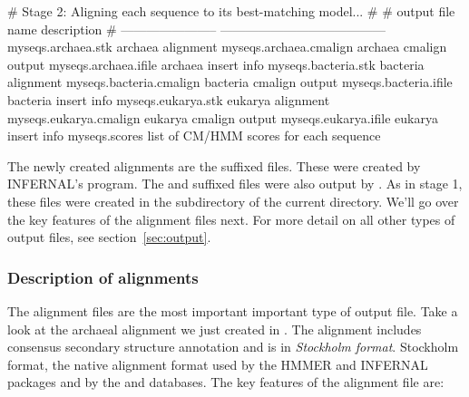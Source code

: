 \begin{sreoutput}
# Stage 2: Aligning each sequence to its best-matching model...
#
# output file name         description
# -----------------------  ---------------------------------------
  myseqs.archaea.stk       archaea alignment
  myseqs.archaea.cmalign   archaea cmalign output
  myseqs.archaea.ifile     archaea insert info
  myseqs.bacteria.stk      bacteria alignment
  myseqs.bacteria.cmalign  bacteria cmalign output
  myseqs.bacteria.ifile    bacteria insert info
  myseqs.eukarya.stk       eukarya alignment
  myseqs.eukarya.cmalign   eukarya cmalign output
  myseqs.eukarya.ifile     eukarya insert info
  myseqs.scores            list of CM/HMM scores for each sequence
\end{sreoutput}

The newly created alignments are the  suffixed files. These
were created by INFERNAL's  program. The
 and  suffixed files were also output by
. As in stage 1, these files were created in the
 subdirectory of the current directory. We'll go over
the key features of the alignment files next. For more detail on all
other types of output files, see section~\ref{sec:output}.

\subsubsection{Description of alignments}
\label{sec:tutorial-stk}

The alignment files are the most important important type of output
file. Take a look at the archaeal alignment we just created in
. The alignment includes consensus
secondary structure annotation and is in \emph{Stockholm format}.
Stockholm format, the native alignment format used by the HMMER
and INFERNAL packages and by the  and 
databases. The key features of the alignment file are:

